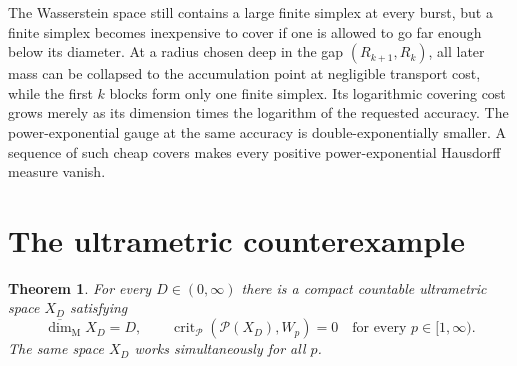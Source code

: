 \documentclass[11pt]{article}
\newtheorem{theorem}{Theorem}
\newcommand{\Pcal}{\mathscr P}
\newcommand{\Prob}{\mathcal P}
\newcommand{\Mdim}{\overline{\dim}_{\mathrm M}}
\begin{document}
The Wasserstein space still contains a large finite simplex at every burst,
but a finite simplex becomes inexpensive to cover if one is allowed to go
far enough below its diameter.  At a radius chosen deep in the gap
$(R_{k+1},R_k)$, all later mass can be collapsed to the accumulation point at
negligible transport cost, while the first $k$ blocks form only one finite
simplex.  Its logarithmic covering cost grows merely as its dimension times
the logarithm of the requested accuracy.  The power-exponential gauge at
the same accuracy is double-exponentially smaller.  A sequence of such cheap
covers makes every positive power-exponential Hausdorff measure vanish.

\section{The ultrametric counterexample}

\begin{theorem}\label{thm:main}
For every $D\in(0,\infty)$ there is a compact countable ultrametric space
$X_D$ satisfying
\[
       \Mdim X_D=D,
       \qquad
       \operatorname{crit}_{\Pcal}(\Prob(X_D),W_p)=0
       \quad\text{for every }p\in[1,\infty).
\]
The same space $X_D$ works simultaneously for all $p$.
\end{theorem}
\end{document}
